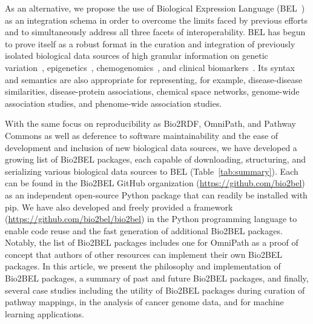 As an alternative, we propose the use of Biological Expression Language (BEL~\cite{Slater2014}) as an integration schema in order to overcome the limits faced by previous efforts and to simultaneously address all three facets of interoperability.
BEL has begun to prove itself as a robust format in the curation and integration of previously isolated biological data sources of high granular information on genetic variation~\cite{Naz2016}, epigenetics~\cite{Irin2015}, chemogenomics~\cite{Emon2017}, and clinical biomarkers~\cite{Iyappan2017}.
Its syntax and semantics are also appropriate for representing, for example, disease-disease similarities, disease-protein associations, chemical space networks, genome-wide association studies, and phenome-wide association studies.

With the same focus on reproducibility as Bio2RDF, OmniPath, and Pathway Commons as well as deference to software maintainability and the ease of development and inclusion of new biological data sources, we have developed a growing list of Bio2BEL packages, each capable of downloading, structuring, and serializing various biological data sources to BEL (Table~\ref{tab:summary}).
Each can be found in the Bio2BEL GitHub organization (\url{https://github.com/bio2bel}) as an independent open-source Python package that can readily be installed with pip.
We have also developed and freely provided a framework (\url{https://github.com/bio2bel/bio2bel}) in the Python programming language to enable code reuse and the fast generation of additional Bio2BEL packages.
Notably, the list of Bio2BEL packages includes one for OmniPath as a proof of concept that authors of other resources can implement their own Bio2BEL packages.
In this article, we present the philosophy and implementation of Bio2BEL packages, a summary of past and future Bio2BEL packages, and finally, several case studies including the utility of Bio2BEL packages during curation of pathway mappings, in the analysis of cancer genome data, and for machine learning applications.
